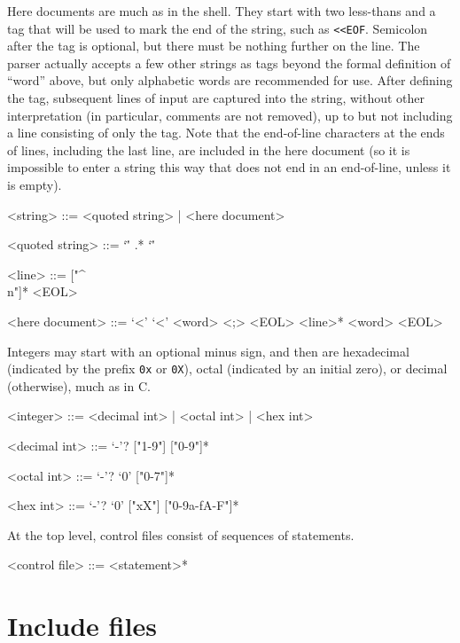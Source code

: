 \documentclass{mitsuba}
\begin{document}
Here documents are much as in the shell.  They start
with two less-thans and a tag that will be used to mark the end of the
string, such as \verb|<<EOF|.  Semicolon after the tag is optional, but
there must be nothing further on the line.  The parser actually accepts a
few other strings as tags beyond the formal definition of ``word'' above,
but only alphabetic words are recommended for use.  After defining the tag,
subsequent lines of input are captured into the string, without other
interpretation (in particular, comments are not removed), up to but not
including a line consisting of only the tag.  Note that the end-of-line
characters at the ends of lines, including the last line, are included in
the here document (so it is impossible to enter a string this way that does
not end in an end-of-line, unless it is empty).

\begin{grammar}
<string> ::= <quoted string> | <here document>

<quoted string> ::= `\"' .* `\"'

<line> ::= ["^\\n"]* <EOL>

<here document> ::= `<' `<' <word> <;> <EOL> <line>* <word> <EOL>
\end{grammar}

Integers may start with an optional minus sign, and then are
hexadecimal (indicated by the prefix \verb|0x| or \verb|0X|), octal
(indicated by an initial zero), or decimal (otherwise), much as in C.

\begin{grammar}
<integer> ::= <decimal int> | <octal int> | <hex int>

<decimal int> ::= `-'? ["1-9"] ["0-9"]*

<octal int> ::= `-'? `0' ["0-7"]*

<hex int> ::= `-'? `0' ["xX"] ["0-9a-fA-F"]*
\end{grammar}

At the top level, control files consist of sequences of statements. 

\begin{grammar}
<control file> ::= <statement>*
\end{grammar}

\section{Include files}
\end{document}
